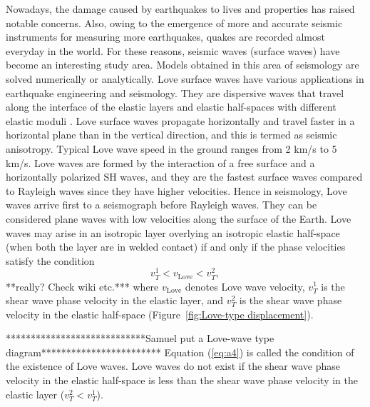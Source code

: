 \documentclass[11pt,letter,subeqn,fleqn]{article}
\numberwithin{equation}{section}
\numberwithin{table}{section}
\numberwithin{figure}{section}
\begin{document}
Nowadays, the damage caused by earthquakes to lives and properties has raised notable concerns. Also, owing to the emergence of more and accurate seismic instruments for measuring more earthquakes, quakes are recorded almost everyday in the world. For these reasons, seismic waves (surface waves) have become an interesting study area. Models obtained in this area of seismology are solved numerically or analytically. Love surface waves have various applications in earthquake engineering and seismology. They are dispersive waves that travel along the interface of the elastic layers and elastic half-spaces with different elastic moduli \cite{rushchitsky2011theory,rushchitsky2014nonlinear}.
Love surface waves propagate horizontally and travel faster in a horizontal plane than in the vertical direction, and this is termed as seismic anisotropy. Typical Love wave speed in the ground ranges from 2 km/s to 5 km/s. Love waves are formed by the interaction of a free surface and a horizontally polarized SH waves, and they are the fastest surface waves compared to Rayleigh waves since they have higher velocities. Hence in seismology, Love waves arrive first to a seismograph before Rayleigh waves. They can be considered plane waves with low velocities along the surface of the Earth. Love waves may arise in an isotropic layer overlying an isotropic elastic half-space (when both the layer are  in welded contact) if and only if the phase velocities satisfy the condition
\begin{equation}\label{eq:a4}
v^1_{T}<v_\mathrm{Love}<v^2_{T},
\end{equation}
\noindent ***really? Check wiki etc.*** where $v_\mathrm{Love}$ denotes Love wave velocity, $v^1_{T}$ is the shear wave phase velocity in the elastic layer, and $v^2_{T}$ is the shear wave phase velocity in the elastic half-space (Figure~\ref{fig:Love-type displacement}).

****************************Samuel put a Love-wave type diagram************************
 Equation (\ref{eq:a4}) is called the condition of the existence of Love waves. Love waves do not exist if the shear wave phase velocity in the elastic half-space is less than the shear wave phase velocity in the elastic layer ($v^2_{T}<v^1_{T}$).
\end{document}
